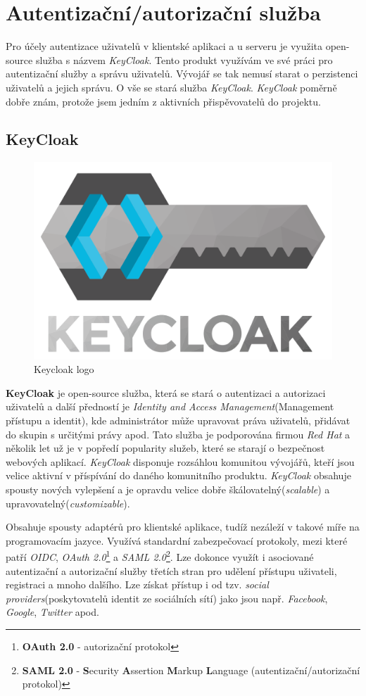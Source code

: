 \newpage
\section{Autentizační/autorizační služba}
\label{pouzite:auth}
Pro účely autentizace uživatelů v klientské aplikaci a u serveru je využita open-source služba s názvem \emph{KeyCloak}.
Tento produkt využívám ve své práci pro autentizační služby a správu uživatelů.
Vývojář se tak nemusí starat o perzistenci uživatelů a jejich správu.
O vše se stará služba \emph{KeyCloak}.
\emph{KeyCloak} poměrně dobře znám, protože jsem jedním z aktivních přispěvovatelů do projektu.

\subsection*{KeyCloak}
\label{terminy:keycloak}

\begin{figure}[hbt]
  \centering
  \includegraphics[width=.25 \linewidth]{obrazky-figures/keycloak2.png}
  \caption{Keycloak logo}
\end{figure}

\textbf{KeyCloak} je open-source služba, která se stará o autentizaci a autorizaci uživatelů a další předností je \emph{Identity and Access Management}(Management přístupu a identit),
kde administrátor může upravovat práva uživatelů, přidávat do skupin s určitými právy apod.
Tato služba je podporována firmou \emph{Red Hat} a několik let už je v popředí popularity služeb, které se starají o bezpečnost webových aplikací. \emph{KeyCloak} disponuje rozsáhlou komunitou vývojářů, kteří jsou velice aktivní v příspívání do daného komunitního produktu.
\emph{KeyCloak} obsahuje spousty nových vylepšení a je opravdu velice dobře škálovatelný(\emph{scalable}) a upravovatelný(\emph{customizable}).

Obsahuje spousty adaptérů pro klientské aplikace, tudíž nezáleží v takové míře na programovacím jazyce.
Využívá standardní zabezpečovací protokoly, mezi které patří \emph{OIDC}, \emph{OAuth 2.0}\footnote{\textbf{OAuth 2.0} - autorizační protokol} a \emph{SAML 2.0}\footnote{\textbf{SAML 2.0} - \textbf{S}ecurity \textbf{A}ssertion \textbf{M}arkup \textbf{L}anguage (autentizační/autorizační protokol)}.
Lze dokonce využít i asociované autentizační a autorizační služby třetích stran pro udělení přístupu uživateli, registraci a mnoho dalšího.
Lze získat přístup i od tzv. \emph{social providers}(poskytovatelů identit ze sociálních sítí) jako jsou např. \emph{Facebook}, \emph{Google}, \emph{Twitter} apod.

